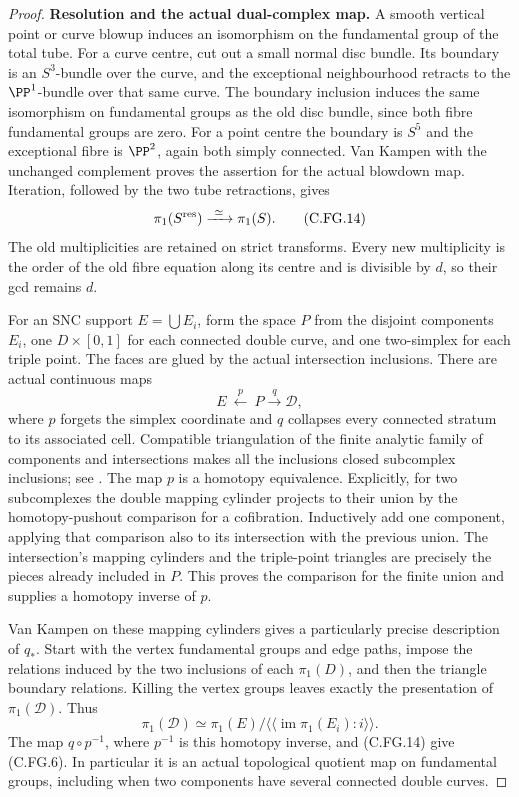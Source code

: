 \begin{proof}
\par\medskip\noindent\textbf{Resolution and the actual dual-complex map.}
A smooth vertical point or curve blowup induces an isomorphism on
the fundamental group of the total tube. For a curve centre, cut
out a small normal disc bundle. Its boundary is an $S^3$-bundle
over the curve, and the exceptional neighbourhood retracts to the
$\PP^1$-bundle over that same curve. The boundary inclusion
induces the same isomorphism on fundamental groups as the old
disc bundle, since both fibre fundamental groups are zero. For
a point centre the boundary is $S^5$ and the exceptional fibre
is $\PP^2$, again both simply connected. Van Kampen with the
unchanged complement proves the assertion for the actual blowdown
map. Iteration, followed by the two tube retractions, gives
\[
              \pi_1(S^{\rm res})\xrightarrow{\ \simeq\ }\pi_1(S).
                                                        \tag{C.FG.14}
\]
The old multiplicities are retained on strict transforms. Every
new multiplicity is the order of the old fibre equation along its
centre and is divisible by $d$, so their gcd remains $d$.

For an SNC support $E=\bigcup E_i$, form the space $P$ from the
disjoint components $E_i$, one $D\times[0,1]$ for each connected
double curve, and one two-simplex for each triple point. The faces
are glued by the actual intersection inclusions. There are actual
continuous maps
\[
                   E\ \xleftarrow{\ p\ }\ P
                       \xrightarrow{\ q\ }\mathcal D,             
                                                        \tag{C.FG.15}
\]
where $p$ forgets the simplex coordinate and $q$ collapses every
connected stratum to its associated cell. Compatible triangulation
of the finite analytic family of components and intersections makes
all the inclusions closed subcomplex inclusions; see
\cite[\S3, Theorem~2]{Lojasiewicz1964}. The map $p$ is a homotopy
equivalence. Explicitly, for two subcomplexes the double mapping
cylinder projects to their union by the homotopy-pushout comparison
for a cofibration. Inductively add one component, applying that
comparison also to its intersection with the previous union.
The intersection's mapping cylinders and the triple-point
triangles are precisely the pieces already included in $P$.
This proves the comparison for the finite union and supplies a
homotopy inverse of $p$.

Van Kampen on these mapping cylinders gives a particularly precise
description of $q_*$. Start with the vertex fundamental groups and
edge paths, impose the relations induced by the two inclusions of
each $\pi_1(D)$, and then the triangle boundary relations.
Killing the vertex groups leaves exactly the presentation of
$\pi_1(\mathcal D)$. Thus
\[
 \pi_1(\mathcal D)\simeq
 \pi_1(E)\big/
       \langle\!\langle\operatorname{im}\pi_1(E_i):i
                              \rangle\!\rangle .       \tag{C.FG.16}
\]
The map $q\circ p^{-1}$, where $p^{-1}$ is this homotopy inverse,
and (C.FG.14) give (C.FG.6). In particular it is an actual
topological quotient map on fundamental groups, including when
two components have several connected double curves.


\end{proof}
